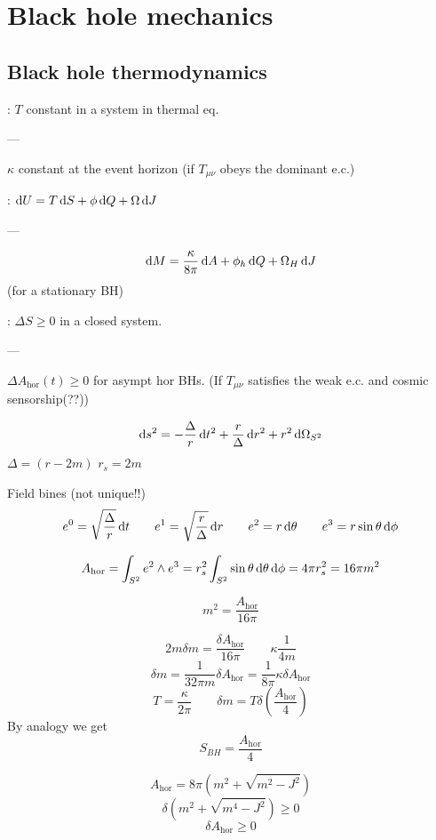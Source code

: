 \chapter{Black hole mechanics}
\section{Black hole thermodynamics}

\begin{eigenschap}
: $T$ constant in a system in thermal eq.

---

$\kappa$ constant at the event horizon (if $T_{\mu\nu}$ obeys the dominant e.c.)
\end{eigenschap}
\begin{eigenschap}
: $\operatorname{d \!}{U} = T \operatorname{d \!}{S} + \phi \operatorname{d \!}{Q} + \Omega \operatorname{d \!}{J}$

---

\[ \operatorname{d \!}{M} = \frac{\kappa}{8\pi}\operatorname{d \!}{A} + \phi_h \operatorname{d \!}{Q} + \Omega_H \operatorname{d \!}{J} \]
(for a stationary BH)
\end{eigenschap}
\begin{eigenschap}
: $\Delta S \geq 0$ in a closed system.

---

$\Delta A_\text{hor}(t) \geq 0$ for asympt hor BHs. (If $T_{\mu\nu}$ satisfies the weak e.c. and cosmic sensorship(??))
\end{eigenschap}

\[ \operatorname{d \!}{s}^2 = - \frac{\Delta}{r}\operatorname{d \!}{t}^2 + \frac{r}{\Delta}\operatorname{d \!}{r}^2 + r^2 \operatorname{d \!}{\Omega_{S^2}} \]
$\Delta = (r-2m)$ $r_s = 2m$

Field bines (not unique!!)
\[ e^0 = \sqrt{\frac{\Delta}{r}}\operatorname{d \!}{t} \qquad e^1 = \sqrt{\frac{r}{\Delta}}\operatorname{d \!}{r} \qquad e^2 = r \operatorname{d \!}{\theta} \qquad e^3 = r\sin\theta \operatorname{d \!}{\phi} \]

\[ A_\text{hor} = \int_{S^2}e^2 \wedge e^3 = r^2_s \int_{S^2} \sin\theta \operatorname{d \!}{\theta}\operatorname{d \!}{\phi} = 4 \pi r_s^2 = 16\pi m^2 \]

\[\boxed{m^2 = \frac{A_\text{hor}}{16\pi}}\]

\[ 2m\delta m = \frac{\delta A_\text{hor}}{16\pi} \qquad \kappa \frac{1}{4m} \]
\[ \delta m = \frac{1}{32\pi m}\delta A_\text{hor} = \frac{1}{8\pi}\kappa \delta A_\text{hor} \]
\[ T = \frac{\kappa}{2\pi} \qquad \delta m = T \delta \left(\frac{A_\text{hor}}{4}\right)\]
By analogy we get
\[ S_{BH} = \frac{A_\text{hor}}{4} \]

\[ A_\text{hor} = 8\pi \left(m^2 + \sqrt{m^2-J^2}\right) \]
\[ \delta \left(m^2 + \sqrt{m^4 - J^2}\right) \geq 0 \]
\[ \delta A_\text{hor} \geq 0 \]

